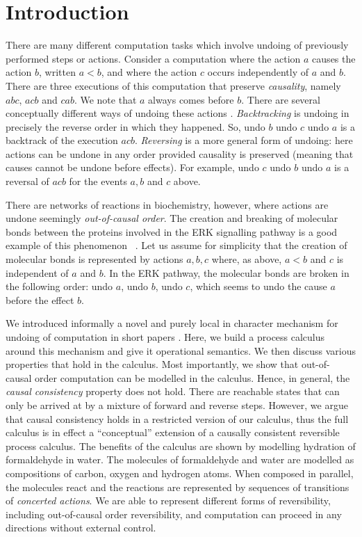 \section{Introduction}\label{sec:intro}
There are many different computation tasks which involve undoing of previously 
performed steps or actions. Consider a computation where the action $a$ causes the action $b$,
written $a<b$, and where the action $c$ occurs independently of $a$ and $b$.
There are three  executions of this computation that preserve \emph{causality},
namely $abc$, $acb$ and $cab$. We note that $a$ always comes before $b$.
There are several conceptually different ways of undoing these actions
\cite{irek2014}. {\em Backtracking}
is undoing in precisely the reverse order in which they happened. So, undo $b$ undo $c$ undo
$a$ is a backtrack of the execution $acb$.
{\em Reversing\/} is a more general form of undoing: here actions can be undone in any
order provided causality is preserved (meaning that causes cannot be undone before effects).
For example, undo $c$ undo $b$ undo $a$ is a reversal of $acb$ for the events $a,b$ 
and $c$ above.


There are networks of reactions in biochemistry, however, 
where actions are undone seemingly \emph{out-of-causal order}.
The creation and breaking of molecular bonds between the proteins involved
in the ERK signalling pathway is a good example 
of this phenomenon ~\cite{Irek2012}. Let us assume for simplicity that the creation of molecular 
bonds is represented by actions $a,b,c$ where, as above, $a<b$ and $c$ is independent 
of $a$ and $b$. In the ERK pathway, the molecular bonds are broken in the following 
order: undo $a$, undo $b$, undo $c$, which seems to undo the cause $a$ before the effect $b$. 

We introduced informally a novel and purely local in character mechanism for undoing
of computation in short papers \cite{merevcomp2015,KU16}. Here, we build a process calculus 
around this mechanism and give it operational semantics.
We then discuss various properties that hold in the calculus. Most importantly, 
we show that out-of-causal order computation can be modelled in the calculus. Hence, in general,
the \emph{causal consistency} property \cite{danos2004ccsr} does not hold. There are reachable states 
that can only be arrived at by a mixture of forward and reverse steps. However, we argue that 
causal consistency holds in a restricted version of our calculus, thus the full calculus is in effect
a ``conceptual'' extension of a causally consistent reversible process calculus. The benefits
of the calculus are shown by modelling hydration of formaldehyde 
in water. The molecules of formaldehyde and water are modelled as compositions 
of carbon, oxygen and hydrogen atoms. When composed in parallel, the molecules react 
and the reactions are represented by sequences of transitions of \emph{concerted actions}. 
We are able to represent different forms of reversibility, including out-of-causal order 
reversibility, and computation can proceed in any directions without external control.

